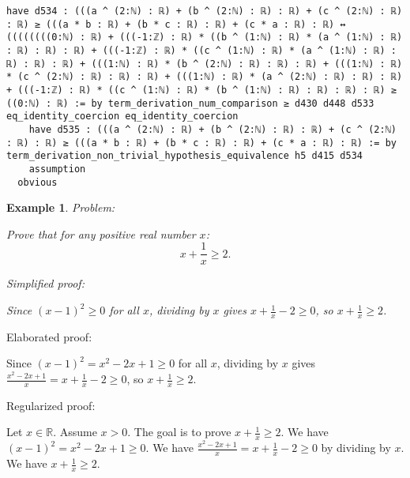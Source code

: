 \documentclass{article}
\newtheorem{example}{Example}
\begin{document}
\begin{tcolorbox}[colback=white!10, width=\linewidth]
\begin{lstlisting}[language=Lean4]
    have d534 : (((a ^ (2:ℕ) : ℝ) + (b ^ (2:ℕ) : ℝ) : ℝ) + (c ^ (2:ℕ) : ℝ) : ℝ) ≥ (((a * b : ℝ) + (b * c : ℝ) : ℝ) + (c * a : ℝ) : ℝ) ↔ ((((((((0:ℕ) : ℝ) + (((-1:ℤ) : ℝ) * ((b ^ (1:ℕ) : ℝ) * (a ^ (1:ℕ) : ℝ) : ℝ) : ℝ) : ℝ) + (((-1:ℤ) : ℝ) * ((c ^ (1:ℕ) : ℝ) * (a ^ (1:ℕ) : ℝ) : ℝ) : ℝ) : ℝ) + (((1:ℕ) : ℝ) * (b ^ (2:ℕ) : ℝ) : ℝ) : ℝ) + (((1:ℕ) : ℝ) * (c ^ (2:ℕ) : ℝ) : ℝ) : ℝ) + (((1:ℕ) : ℝ) * (a ^ (2:ℕ) : ℝ) : ℝ) : ℝ) + (((-1:ℤ) : ℝ) * ((c ^ (1:ℕ) : ℝ) * (b ^ (1:ℕ) : ℝ) : ℝ) : ℝ) : ℝ) ≥ ((0:ℕ) : ℝ) := by term_derivation_num_comparison ≥ d430 d448 d533 eq_identity_coercion eq_identity_coercion
    have d535 : (((a ^ (2:ℕ) : ℝ) + (b ^ (2:ℕ) : ℝ) : ℝ) + (c ^ (2:ℕ) : ℝ) : ℝ) ≥ (((a * b : ℝ) + (b * c : ℝ) : ℝ) + (c * a : ℝ) : ℝ) := by term_derivation_non_trivial_hypothesis_equivalence h5 d415 d534
    assumption
  obvious

\end{lstlisting}
\end{tcolorbox}


\begin{example}
Problem:
\begin{tcolorbox}[colback=yellow!10, width=\linewidth]
Prove that for any positive real number $x$:
    $$x + \frac{1}{x} \geq 2.$$
\end{tcolorbox}

Simplified proof:
\begin{tcolorbox}[colback=blue!10, width=\linewidth]
Since $(x-1)^2 \ge 0$ for all $x$, dividing by $x$ gives $x + \frac{1}{x} - 2 \ge 0$, so $x + \frac{1}{x} \ge 2$.
\end{tcolorbox}
\end{example}

Elaborated proof:
\begin{tcolorbox}[colback=green!10, width=\linewidth]
Since $(x-1)^2 = x^2 - 2x + 1 \ge 0$ for all $x$, dividing by $x$ gives $\frac{x^2 - 2x + 1}{x} = x + \frac{1}{x} - 2 \ge 0$, so $x + \frac{1}{x} \ge 2$.
\end{tcolorbox}

Regularized proof:
\begin{tcolorbox}[colback=red!10, width=\linewidth]
Let $x\in\mathbb{R}$. Assume $x>0$.
The goal is to prove $x + \frac{1}{x} \ge 2$.
We have ${\left(x-1\right)}^2 = x^2 - 2x + 1 \ge 0$.
We have $\frac{x^2 - 2x + 1}{x} = x + \frac{1}{x} - 2 \ge 0$ by dividing by $x$.
We have $x + \frac{1}{x} \ge 2$.
\end{tcolorbox}
\end{document}
